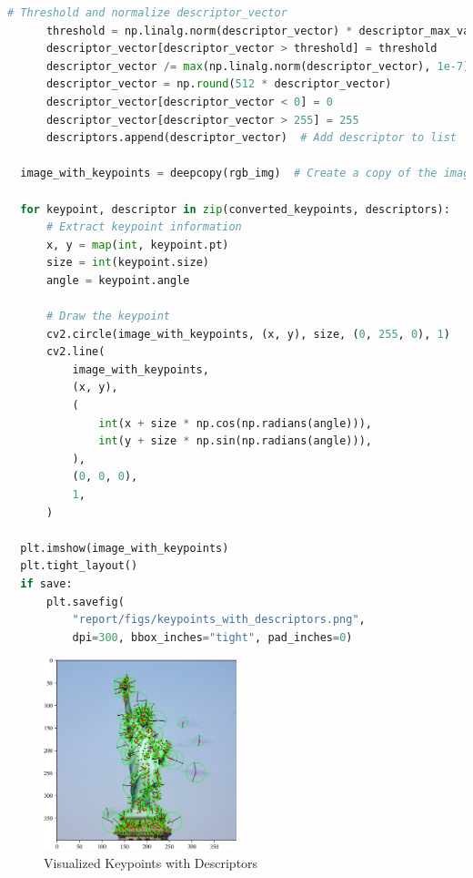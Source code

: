 \documentclass[11pt,a4paper]{article}
\begin{document}
\begin{lstlisting}[language=Python, caption=Keypoint descriptor]
      # Threshold and normalize descriptor_vector
      threshold = np.linalg.norm(descriptor_vector) * descriptor_max_value
      descriptor_vector[descriptor_vector > threshold] = threshold
      descriptor_vector /= max(np.linalg.norm(descriptor_vector), 1e-7)
      descriptor_vector = np.round(512 * descriptor_vector)
      descriptor_vector[descriptor_vector < 0] = 0
      descriptor_vector[descriptor_vector > 255] = 255
      descriptors.append(descriptor_vector)  # Add descriptor to list

  image_with_keypoints = deepcopy(rgb_img)  # Create a copy of the image to draw on

  for keypoint, descriptor in zip(converted_keypoints, descriptors):
      # Extract keypoint information
      x, y = map(int, keypoint.pt)
      size = int(keypoint.size)
      angle = keypoint.angle

      # Draw the keypoint
      cv2.circle(image_with_keypoints, (x, y), size, (0, 255, 0), 1)
      cv2.line(
          image_with_keypoints,
          (x, y),
          (
              int(x + size * np.cos(np.radians(angle))),
              int(y + size * np.sin(np.radians(angle))),
          ),
          (0, 0, 0),
          1,
      )

  plt.imshow(image_with_keypoints)
  plt.tight_layout()
  if save:
      plt.savefig(
          "report/figs/keypoints_with_descriptors.png",
          dpi=300, bbox_inches="tight", pad_inches=0)
\end{lstlisting}

\begin{figure}[ht!]
  \centering
  \includegraphics[width=0.5\textwidth]{figs/keypoints_with_descriptors.png}
  \caption{Visualized Keypoints with Descriptors}
\end{figure}
\end{document}
